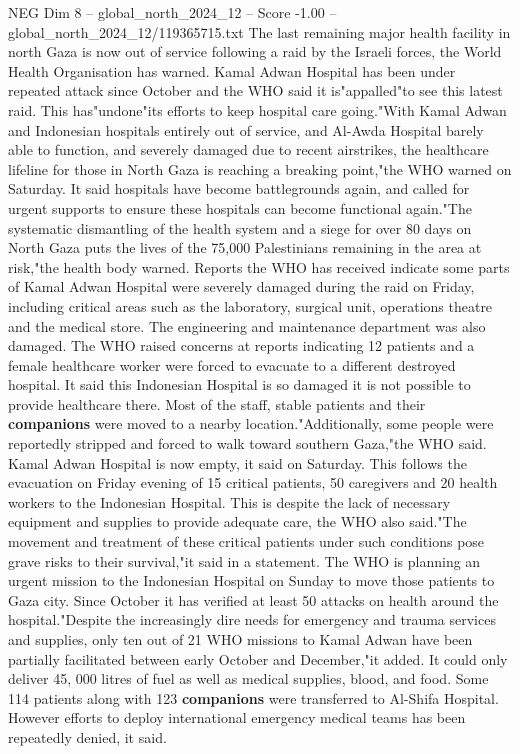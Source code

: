 \begin{textsample}{NEG Dim 8 – global\_north\_2024\_12 – Score -1.00 – global\_north\_2024\_12/119365715.txt}  \label{ex:f8_neg_116}
The last remaining major health facility in north Gaza is now out of service following a raid by the Israeli forces, the World Health Organisation has warned.
Kamal Adwan Hospital has been under repeated attack since October and the WHO said it is"appalled"to see this latest raid.
This has"undone"its efforts to keep hospital care going."With Kamal Adwan and Indonesian hospitals entirely out of service, and Al-Awda Hospital barely able to function, and severely damaged due to recent airstrikes, the healthcare lifeline for those in North Gaza is reaching a breaking point,"the WHO warned on Saturday.
It said hospitals have become battlegrounds again, and called for urgent supports to ensure these hospitals can become functional again."The systematic dismantling of the health system and a siege for over 80 days on North Gaza puts the lives of the 75,000 Palestinians remaining in the area at risk,"the health body warned.
Reports the WHO has received indicate some parts of Kamal Adwan Hospital were severely damaged during the raid on Friday, including critical areas such as the laboratory, surgical unit, operations theatre and the medical store.
The engineering and maintenance department was also damaged.
The WHO raised concerns at reports indicating 12 patients and a female healthcare worker were forced to evacuate to a different destroyed hospital.
It said this Indonesian Hospital is so damaged it is not possible to provide healthcare there.
Most of the staff, stable patients and their \textbf{companions} were moved to a nearby location."Additionally, some people were reportedly stripped and forced to walk toward southern Gaza,"the WHO said.
Kamal Adwan Hospital is now empty, it said on Saturday.
This follows the evacuation on Friday evening of 15 critical patients, 50 caregivers and 20 health workers to the Indonesian Hospital.
This is despite the lack of necessary equipment and supplies to provide adequate care, the WHO also said."The movement and treatment of these critical patients under such conditions pose grave risks to their survival,"it said in a statement.
The WHO is planning an urgent mission to the Indonesian Hospital on Sunday to move those patients to Gaza city.
Since October it has verified at least 50 attacks on health around the hospital."Despite the increasingly dire needs for emergency and trauma services and supplies, only ten out of 21 WHO missions to Kamal Adwan have been partially facilitated between early October and December,"it added.
It could only deliver 45, 000 litres of fuel as well as medical supplies, blood, and food.
Some 114 patients along with 123 \textbf{companions} were transferred to Al-Shifa Hospital.
However efforts to deploy international emergency medical teams has been repeatedly denied, it said.

\end{textsample}
